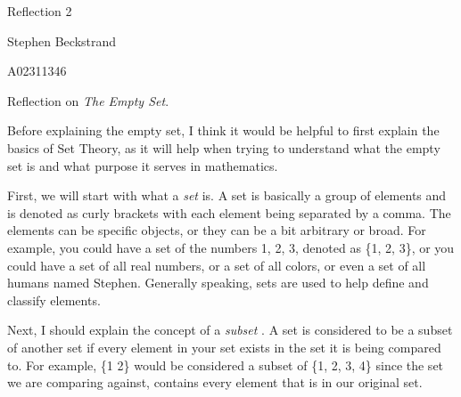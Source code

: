 \documentclass[12pt]{article}
\begin{document}
\thispagestyle{empty}
\raggedright

\hfill Reflection 2  %

\hfill Stephen Beckstrand  %

\hfill A02311346 %

Reflection on \emph{The Empty Set}.  %

\begin{flushleft}
Before explaining the empty set, I think it would be helpful to first explain the basics of Set Theory, as it will help when trying to understand what the empty set is and what purpose it serves in mathematics.
\end{flushleft}

\begin{flushleft}
First, we will start with what a \textit{set} is. A set is basically a group of elements and is denoted as curly brackets with each element being separated by a comma. The elements can be specific objects, or they can be a bit arbitrary or broad. For example, you could have a set of the numbers 1, 2, 3, denoted as \{1, 2, 3\}, or you could have a set of all real numbers, or a set of all colors, or even a set of all humans named Stephen. Generally speaking, sets are used to help define and classify elements.
\end{flushleft}

\begin{flushleft}
Next, I should explain the concept of a \textit{subset} . A set is considered to be a subset of another set if every element in your set exists in the set it is being compared to. For example, \{1 2\} would be considered a subset of \{1, 2, 3, 4\} since the set we are comparing against, contains every element that is in our original set.
\end{flushleft}
\end{document}
